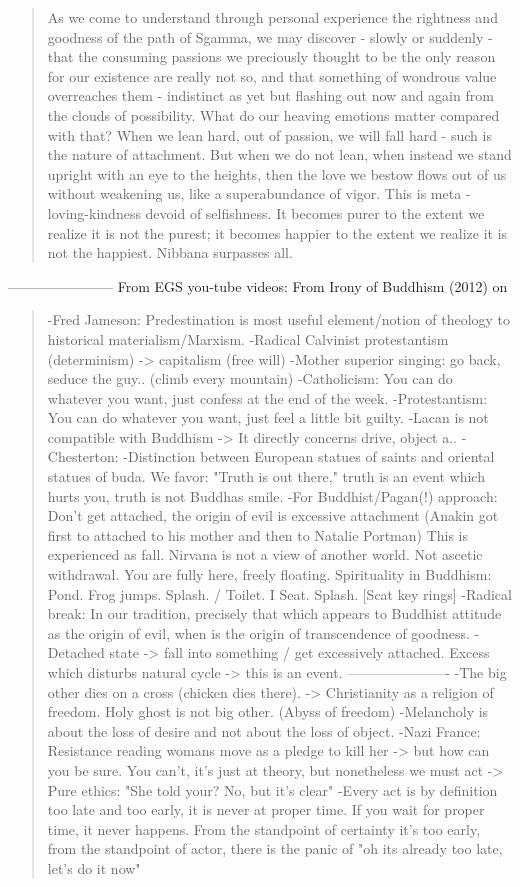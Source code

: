 \documentclass{book}
\begin{document}
\begin{quotation}
As we come to understand through personal experience the rightness and goodness of the path of Sgamma, we may discover - slowly or suddenly - that the consuming passions we preciously thought to be the only reason for our existence are really not so, and that something of wondrous value overreaches them - indistinct as yet but flashing out now and again from the clouds of possibility. What do our heaving emotions matter compared with that? When we lean hard, out of passion, we will fall hard - such is the nature of attachment. But when we do not lean, when instead we stand upright with an eye to the heights, then the love we bestow flows out of us without weakening us, like a superabundance of vigor. This is meta - loving-kindness devoid of selfishness. It becomes purer to the extent we realize it is not the purest; it becomes happier to the extent we realize it is not the happiest. Nibbana surpasses all.
\end{quotation}
-----------------------
From EGS you-tube videos: From Irony of Buddhism (2012) on
\begin{quotation}
-Fred Jameson: Predestination is most useful element/notion of theology to historical materialism/Marxism.
-Radical Calvinist protestantism (determinism) -> capitalism (free will)
-Mother superior singing: go back, seduce the guy.. (climb every mountain)
-Catholicism: You can do whatever you want, just confess at the end of the week.
-Protestantism: You can do whatever you want, just feel a little bit guilty.
-Lacan is not compatible with Buddhism -> It directly concerns drive, object a..
-Chesterton:
-Distinction between European statues of saints and oriental statues of buda. We favor: "Truth is out there," truth is an event which hurts you, truth is not Buddhas smile.
-For Buddhist/Pagan(!) approach: Don't get attached, the origin of evil is excessive attachment (Anakin got first to attached to his mother and then to Natalie Portman) This is experienced as fall. Nirvana is not a view of another world. Not ascetic withdrawal. You are fully here, freely floating. Spirituality in Buddhism: Pond. Frog jumps. Splash. / Toilet. I Seat. Splash. [Scat key rings]
-Radical break: In our tradition, precisely that which appears to Buddhist attitude as the origin of evil, when is the origin of transcendence of goodness.
-Detached state -> fall into something / get excessively attached. Excess which disturbs natural cycle -> this is an event.
----------------------
-The big other dies on a cross (chicken dies there). -> Christianity as a religion of freedom. Holy ghost is not big other. (Abyss of freedom)
-Melancholy is about the loss of desire and not about the loss of object.
-Nazi France: Resistance reading womans move as a pledge to kill her -> but how can you be sure. You can't, it's just at theory, but nonetheless we must act -> Pure ethics: "She told your? No, but it's clear"
-Every act is by definition too late and too early, it is never at proper time. If you wait for proper time, it never happens. From the standpoint of certainty it's too early, from the standpoint of actor, there is the panic of "oh its already too late, let's do it now"
\end{quotation}
\end{document}
